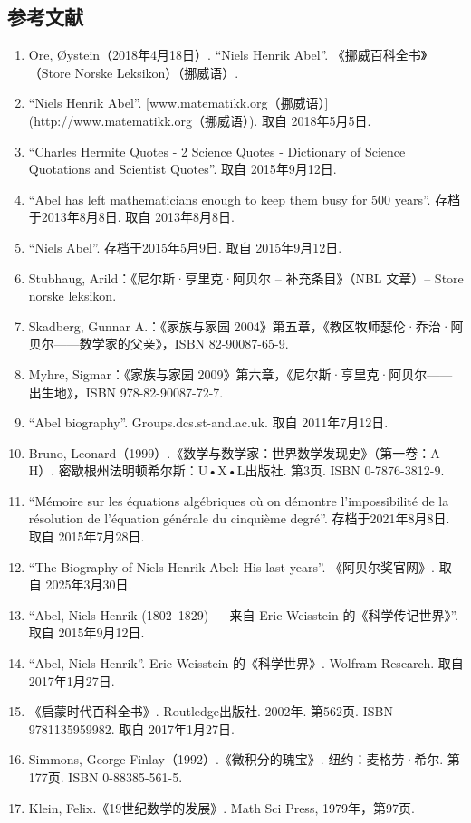 \subsection{参考文献}
\begin{enumerate}
\item Ore, Øystein（2018年4月18日）. “Niels Henrik Abel”. 《挪威百科全书》（Store Norske Leksikon）（挪威语）.
\item “Niels Henrik Abel”. [www.matematikk.org（挪威语）](http://www.matematikk.org（挪威语）). 取自 2018年5月5日.
\item “Charles Hermite Quotes - 2 Science Quotes - Dictionary of Science Quotations and Scientist Quotes”. 取自 2015年9月12日.
\item “Abel has left mathematicians enough to keep them busy for 500 years”. 存档于2013年8月8日. 取自 2013年8月8日.
\item “Niels Abel”. 存档于2015年5月9日. 取自 2015年9月12日.
\item Stubhaug, Arild：《尼尔斯·亨里克·阿贝尔 – 补充条目》（NBL 文章）– Store norske leksikon.
\item Skadberg, Gunnar A.：《家族与家园 2004》第五章，《教区牧师瑟伦·乔治·阿贝尔——数学家的父亲》，ISBN 82-90087-65-9.
\item Myhre, Sigmar：《家族与家园 2009》第六章，《尼尔斯·亨里克·阿贝尔——出生地》，ISBN 978-82-90087-72-7.
\item “Abel biography”. Groups.dcs.st-and.ac.uk. 取自 2011年7月12日.
\item Bruno, Leonard（1999）.《数学与数学家：世界数学发现史》（第一卷：A-H）. 密歇根州法明顿希尔斯：U•X•L出版社. 第3页. ISBN 0-7876-3812-9.
\item “Mémoire sur les équations algébriques où on démontre l'impossibilité de la résolution de l'équation générale du cinquième degré”. 存档于2021年8月8日. 取自 2015年7月28日.
\item “The Biography of Niels Henrik Abel: His last years”. 《阿贝尔奖官网》. 取自 2025年3月30日.
\item “Abel, Niels Henrik (1802–1829) — 来自 Eric Weisstein 的《科学传记世界》”. 取自 2015年9月12日.
\item “Abel, Niels Henrik”. Eric Weisstein 的《科学世界》. Wolfram Research. 取自 2017年1月27日.
\item 《启蒙时代百科全书》. Routledge出版社. 2002年. 第562页. ISBN 9781135959982. 取自 2017年1月27日.
\item Simmons, George Finlay（1992）.《微积分的瑰宝》. 纽约：麦格劳·希尔. 第177页. ISBN 0-88385-561-5.
\item Klein, Felix.《19世纪数学的发展》. Math Sci Press, 1979年，第97页.
\end{enumerate}
